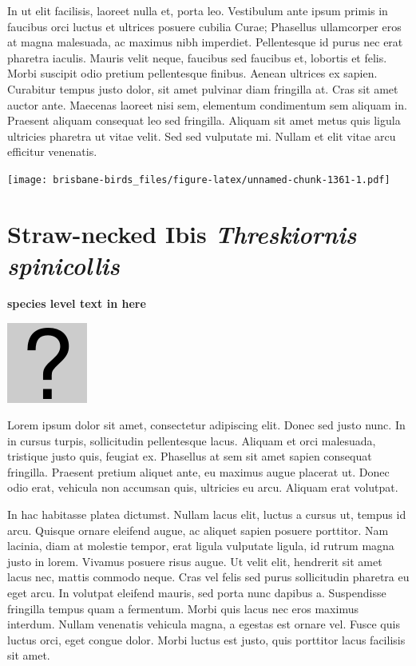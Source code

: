 \documentclass[]{book}
\let\origfigure\figure
\let\endorigfigure\endfigure
\renewenvironment{figure}[1][2] {
  \expandafter\origfigure\expandafter[H]
} {
  \endorigfigure
}
\begin{document}
In ut elit facilisis, laoreet nulla et, porta leo. Vestibulum ante ipsum
primis in faucibus orci luctus et ultrices posuere cubilia Curae;
Phasellus ullamcorper eros at magna malesuada, ac maximus nibh
imperdiet. Pellentesque id purus nec erat pharetra iaculis. Mauris velit
neque, faucibus sed faucibus et, lobortis et felis. Morbi suscipit odio
pretium pellentesque finibus. Aenean ultrices ex sapien. Curabitur
tempus justo dolor, sit amet pulvinar diam fringilla at. Cras sit amet
auctor ante. Maecenas laoreet nisi sem, elementum condimentum sem
aliquam in. Praesent aliquam consequat leo sed fringilla. Aliquam sit
amet metus quis ligula ultricies pharetra ut vitae velit. Sed sed
vulputate mi. Nullam et elit vitae arcu efficitur venenatis.

\begin{figure}
\centering
\texttt{[image: brisbane-birds\_files/figure-latex/unnamed-chunk-1361-1.pdf]}
\caption{\label{fig:unnamed-chunk-1361}insert figure caption}
\end{figure}

\section{\texorpdfstring{Straw-necked Ibis \emph{Threskiornis
spinicollis}}{Straw-necked Ibis Threskiornis spinicollis}}\label{straw-necked-ibis-threskiornis-spinicollis}

\textbf{species level text in here}

\begin{figure}
\centering
\includegraphics{assets/missing.png}
\caption{No image for species}
\end{figure}

Lorem ipsum dolor sit amet, consectetur adipiscing elit. Donec sed justo
nunc. In in cursus turpis, sollicitudin pellentesque lacus. Aliquam et
orci malesuada, tristique justo quis, feugiat ex. Phasellus at sem sit
amet sapien consequat fringilla. Praesent pretium aliquet ante, eu
maximus augue placerat ut. Donec odio erat, vehicula non accumsan quis,
ultricies eu arcu. Aliquam erat volutpat.

In hac habitasse platea dictumst. Nullam lacus elit, luctus a cursus ut,
tempus id arcu. Quisque ornare eleifend augue, ac aliquet sapien posuere
porttitor. Nam lacinia, diam at molestie tempor, erat ligula vulputate
ligula, id rutrum magna justo in lorem. Vivamus posuere risus augue. Ut
velit elit, hendrerit sit amet lacus nec, mattis commodo neque. Cras vel
felis sed purus sollicitudin pharetra eu eget arcu. In volutpat eleifend
mauris, sed porta nunc dapibus a. Suspendisse fringilla tempus quam a
fermentum. Morbi quis lacus nec eros maximus interdum. Nullam venenatis
vehicula magna, a egestas est ornare vel. Fusce quis luctus orci, eget
congue dolor. Morbi luctus est justo, quis porttitor lacus facilisis sit
amet.
\end{document}
